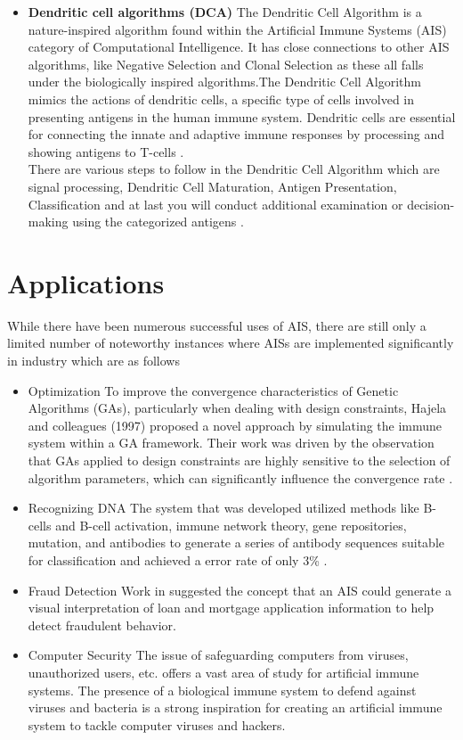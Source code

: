 \documentclass{article}
\begin{document}
\begin{itemize}
    \item \textbf{Dendritic cell algorithms (DCA)}
The Dendritic Cell Algorithm is a nature-inspired algorithm found within the Artificial Immune Systems (AIS) category of Computational Intelligence. It has close connections to other AIS algorithms, like Negative Selection and Clonal Selection as these all falls under the biologically inspired algorithms.The Dendritic Cell Algorithm mimics the actions of dendritic cells, a specific type of cells involved in presenting antigens in the human immune system. Dendritic cells are essential for connecting the innate and adaptive immune responses by processing and showing antigens to T-cells \cite{dendritic_algorithm}.\\
There are various steps to follow in the Dendritic Cell Algorithm which are signal processing, Dendritic Cell Maturation, Antigen Presentation, Classification and at last you will conduct additional examination or decision-making using the categorized antigens \cite{dendritic_algorithm}. 
\end{itemize}
\section{Applications}
While there have been numerous successful uses of AIS, there are still only a limited number of noteworthy instances where AISs are implemented significantly in industry which are as follows\\
\begin{itemize}
    \item Optimization
To improve the convergence characteristics of Genetic Algorithms (GAs), particularly when dealing with design constraints, Hajela and colleagues (1997) proposed a novel approach by simulating the immune system within a GA framework. Their work was driven by the observation that GAs applied to design constraints are highly sensitive to the selection of algorithm parameters, which can significantly influence the convergence rate \cite{hajela1997ga}.
    \item Recognizing DNA
The system that was developed utilized methods like B-cells and B-cell activation, immune network theory, gene repositories, mutation, and antibodies to generate a series of antibody sequences suitable for classification and achieved a error rate of only 3\% \cite{timmis2004overview}.
    \item Fraud Detection
Work in \cite{HUNT1996189} suggested the concept that an AIS could generate a visual interpretation of loan and mortgage application information to help detect fraudulent behavior. 
    \item Computer Security
The issue of safeguarding computers from viruses, unauthorized users, etc. offers a vast area of study for artificial immune systems. The presence of a biological immune system to defend against viruses and bacteria is a strong inspiration for creating an artificial immune system to tackle computer viruses and hackers. \cite{timmis2004overview}
    \end{itemize}
\end{document}
